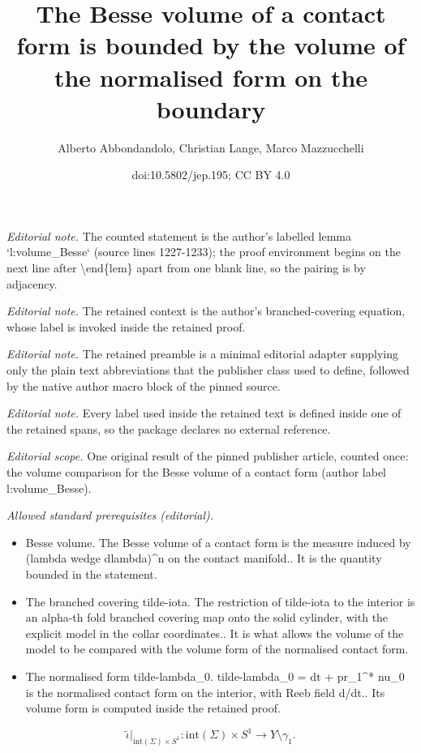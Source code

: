 \documentclass[10pt,a4paper]{article}
\title{The Besse volume of a contact form is bounded by the volume of the normalised form on the boundary}
\author{Alberto Abbondandolo, Christian Lange, Marco Mazzucchelli}
\date{doi:10.5802/jep.195; CC BY 4.0}
\theoremstyle{definition}
\begin{document}
\maketitle
\noindent\textit{Editorial note.} The counted statement is the author's labelled lemma `l:volume\_Besse` (source lines 1227-1233); the proof environment begins on the next line after \textbackslash{}end\{lem\} apart from one blank line, so the pairing is by adjacency.\par\medskip
\noindent\textit{Editorial note.} The retained context is the author's branched-covering equation, whose label is invoked inside the retained proof.\par\medskip
\noindent\textit{Editorial note.} The retained preamble is a minimal editorial adapter supplying only the plain text abbreviations that the publisher class used to define, followed by the native author macro block of the pinned source.\par\medskip
\noindent\textit{Editorial note.} Every label used inside the retained text is defined inside one of the retained spans, so the package declares no external reference.\par\medskip
\noindent\textit{Editorial scope.} One original result of the pinned publisher article, counted once: the volume comparison for the Besse volume of a contact form (author label l:volume\_Besse).\par\medskip
\noindent\textit{Allowed standard prerequisites (editorial).}\begin{itemize}
\item Besse volume. The Besse volume of a contact form is the measure induced by (lambda wedge dlambda)\textasciicircum{}n on the contact manifold.. It is the quantity bounded in the statement.
\item The branched covering tilde-iota. The restriction of tilde-iota to the interior is an alpha-th fold branched covering map onto the solid cylinder, with the explicit model in the collar coordinates.. It is what allows the volume of the model to be compared with the volume form of the normalised contact form.
\item The normalised form tilde-lambda\_0. tilde-lambda\_0 = dt + pr\_1\textasciicircum{}* nu\_0 is the normalised contact form on the interior, with Reeb field d/dt.. Its volume form is computed inside the retained proof.
\end{itemize}\medskip
\begin{equation}
\label{e:alpha_covering_map}
\tilde \iota|_{\mathrm{int}(\Sigma)\times S^1}:\mathrm{int}(\Sigma)\times S^1\to Y\setminus\gamma_1.
\end{equation}
\end{document}
